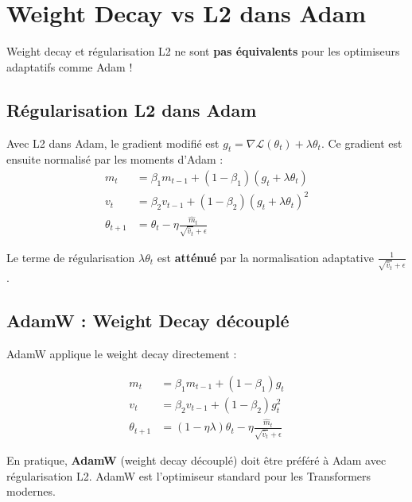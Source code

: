 \section{Weight Decay vs L2 dans Adam}
\label{sec:weight-decay-adam}

\begin{attention}[title=\textbf{Diff\'erence cruciale}]
Weight decay et r\'egularisation L2 ne sont \textbf{pas \'equivalents} pour
les optimiseurs adaptatifs comme Adam !
\end{attention}

\subsection{R\'egularisation L2 dans Adam}

Avec L2 dans Adam, le gradient modifi\'e est $g_t = \nabla \mathcal{L}(\theta_t) + \lambda \theta_t$.
Ce gradient est ensuite normalis\'e par les moments d'Adam :
\begin{align}
m_t &= \beta_1 m_{t-1} + (1 - \beta_1)(g_t + \lambda \theta_t) \\
v_t &= \beta_2 v_{t-1} + (1 - \beta_2)(g_t + \lambda \theta_t)^2 \\
\theta_{t+1} &= \theta_t - \eta \frac{\hat{m}_t}{\sqrt{\hat{v}_t} + \epsilon}
\end{align}

Le terme de r\'egularisation $\lambda \theta_t$ est \textbf{att\'enu\'e} par
la normalisation adaptative $\frac{1}{\sqrt{\hat{v}_t} + \epsilon}$.

\subsection{AdamW : Weight Decay d\'ecoupl\'e}

AdamW \cite{loshchilov2019decoupled} applique le weight decay directement :
\begin{formules}[title=\textbf{AdamW}]
\begin{align}
m_t &= \beta_1 m_{t-1} + (1 - \beta_1) g_t \\
v_t &= \beta_2 v_{t-1} + (1 - \beta_2) g_t^2 \\
\theta_{t+1} &= (1 - \eta\lambda)\theta_t
               - \eta \frac{\hat{m}_t}{\sqrt{\hat{v}_t} + \epsilon}
\end{align}
\end{formules}

\begin{bonnepratique}[title=\textbf{Utiliser AdamW}]
En pratique, \textbf{AdamW} (weight decay d\'ecoupl\'e) doit \^etre
pr\'ef\'er\'e \`a Adam avec r\'egularisation L2. AdamW est l'optimiseur
standard pour les Transformers modernes.
\end{bonnepratique}

